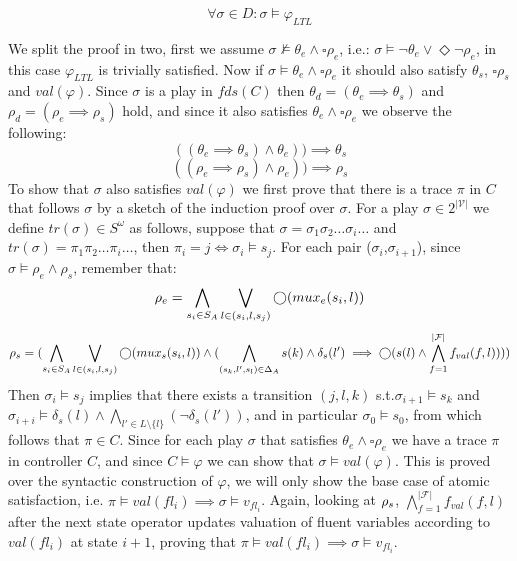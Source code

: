 \[\forall \sigma \in D: \sigma \models \varphi_{LTL} \]

We split the proof in two, first we assume $\sigma \not\models \theta_e \wedge \square \rho_e$, i.e.: $\sigma \models \neg\theta_e \vee \Diamond \neg\rho_e$, in this case $\varphi_{LTL}$ is trivially satisfied. Now if $\sigma \models \theta_e \wedge \square \rho_e$ it should also satisfy $\theta_s$, $\square\rho_s$ and $val(\varphi)$. Since $\sigma$ is a play in $fds(C)$ then $\theta_d=(\theta_e \implies \theta_s)$ and $\rho_d=(\rho_e \implies \rho_s)$ hold, and since it also satisfies $\theta_e \wedge \square \rho_e$ we observe the following:
\[((\theta_e \implies \theta_s) \wedge \theta_e))\implies \theta_s\]
\[((\rho_e \implies \rho_s) \wedge \rho_e))\implies \rho_s\]
To show that $\sigma$ also satisfies $val(\varphi)$ we first prove that there is a trace $\pi$ in $C$ that follows $\sigma$ by a sketch of the induction proof over $\sigma$. For a play $\sigma \in 2^{|\mathcal{V}|}$ we define $tr(\sigma) \in S^{\omega}$ as follows, suppose that $\sigma = \sigma_1 \sigma_2 \ldots \sigma_i \ldots$ and
$tr(\sigma)= \pi_1 \pi_2 \ldots \pi_i \ldots$, then $\pi_i = j \iff \sigma_i \models s_j$. For each pair ($\sigma_i$,$\sigma_{i+1}$), since $\sigma \models \rho_e \wedge \rho_s$, remember that: 
\[ {\rho_e} = \bigwedge_{s_i \in S_A} \bigvee_{l \in (s_i,l,s_j)}\bigcirc(mux_e(s_i,l))\]
\[ {\rho_s} = (\bigwedge_{s_i \in S_A} \bigvee_{l \in (s_i,l,s_j)}\bigcirc(mux_s(s_i,l)) \wedge (\bigwedge_{(s_k,l',s_l) \in \Delta_A} s(k) \wedge \delta_s(l') \implies \bigcirc(s(l) \wedge \bigwedge_{f = 1}^{|\mathcal{F}|}f_{val}(f,l) ) ) ) \]
Then $\sigma_i \models s_j$ implies that there exists a transition $(j, l, k)$ s.t.$\sigma_{i+1} \models s_k$ and $\sigma_{i+i} \models \delta_s(l) \wedge \bigwedge_{l' \in L \setminus \{l\}}(\neg \delta_s(l'))$, and in particular $\sigma_0 \models s_0$, from which follows that $\pi \in C$.
Since for each play $\sigma$ that satisfies $\theta_e \wedge \square \rho_e$ we have a trace $\pi$ in controller $C$, and since $C \models \varphi$ we can show that $\sigma \models val(\varphi)$.
This is proved over the syntactic construction of $\varphi$, we will only show the base case of atomic satisfaction, i.e.
$\pi \models val(fl_i) \implies \sigma \models v_{fl_i}$. Again, looking at ${\rho_s}$, $\bigwedge_{f = 1}^{|\mathcal{F}|}f_{val}(f,l)$ after the next state operator updates valuation of fluent variables according to $val(fl_i)$ at state $i+1$, proving that $\pi \models val(fl_i) \implies \sigma \models v_{fl_i}$.


